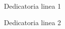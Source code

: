 \setcounter{page}{2}
\begin{dedication}
   \thispagestyle{plain}
    Dedicatoria linea 1\par 
    Dedicatoria linea 2\par     
    \par   %
    \vspace{2\baselineskip}
    \vspace{\baselineskip}
  \end{dedication}
